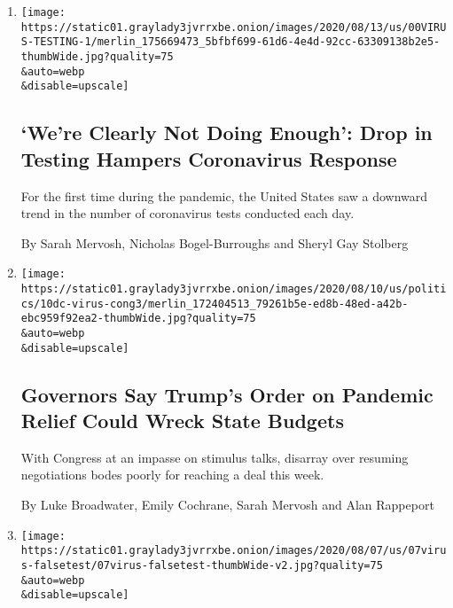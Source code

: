 \begin{enumerate}
\def\labelenumi{\arabic{enumi}.}
\item
  \href{/2020/08/15/us/coronavirus-testing-decrease.html}{}

  \texttt{[image: https://static01.graylady3jvrrxbe.onion/images/2020/08/13/us/00VIRUS-TESTING-1/merlin\_175669473\_5bfbf699-61d6-4e4d-92cc-63309138b2e5-thumbWide.jpg?quality=75\\\&auto=webp\\\&disable=upscale]}

  \hypertarget{were-clearly-not-doing-enough-drop-in-testing-hampers-coronavirus-response}{%
  \subsection{`We're Clearly Not Doing Enough': Drop in Testing Hampers
  Coronavirus
  Response}\label{were-clearly-not-doing-enough-drop-in-testing-hampers-coronavirus-response}}

  For the first time during the pandemic, the United States saw a
  downward trend in the number of coronavirus tests conducted each day.

  By Sarah Mervosh, Nicholas Bogel-Burroughs and Sheryl Gay Stolberg
\item
  \href{/2020/08/10/us/politics/virus-stimulus-congress-trump.html}{}

  \texttt{[image: https://static01.graylady3jvrrxbe.onion/images/2020/08/10/us/politics/10dc-virus-cong3/merlin\_172404513\_79261b5e-ed8b-48ed-a42b-ebc959f92ea2-thumbWide.jpg?quality=75\\\&auto=webp\\\&disable=upscale]}

  \hypertarget{governors-say-trumps-order-on-pandemic-relief-could-wreck-state-budgets}{%
  \subsection{Governors Say Trump's Order on Pandemic Relief Could Wreck
  State
  Budgets}\label{governors-say-trumps-order-on-pandemic-relief-could-wreck-state-budgets}}

  With Congress at an impasse on stimulus talks, disarray over resuming
  negotiations bodes poorly for reaching a deal this week.

  By Luke Broadwater, Emily Cochrane, Sarah Mervosh and Alan Rappeport
\item
  \href{/2020/08/07/us/covid-test-accuracy-governor-dewine-ohio.html}{}

  \texttt{[image: https://static01.graylady3jvrrxbe.onion/images/2020/08/07/us/07virus-falsetest/07virus-falsetest-thumbWide-v2.jpg?quality=75\\\&auto=webp\\\&disable=upscale]}


\end{enumerate}
